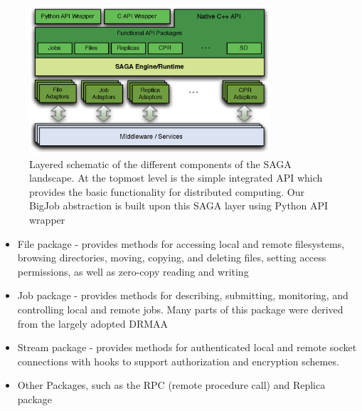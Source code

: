 \documentclass[preprint,12pt]{elsarticle}
\newcommand{\skonote}[1]{ {\textcolor{blue} { ***Jeff: #1 }}}
\newcommand{\skonote}[1]{}
\begin{document}
\begin{figure}
 \begin{center}
     \includegraphics[width=0.8\textwidth]{stci_saga_figures-1.eps}
 \end{center}
\caption{\small Layered schematic of the different components of the SAGA landscape. At the topmost level is the simple integrated API which provides the basic functionality for distributed computing. Our BigJob abstraction is built upon this SAGA layer using Python API wrapper}
 \label{Fig:SAGA1}
 \vspace{-1em}
\end{figure}

\begin{itemize}
\item File package - provides methods for accessing local and remote filesystems, browsing directories, moving, copying, and deleting files, setting access permissions, as well as zero-copy reading and writing
\item Job package - provides methods for describing, submitting, monitoring, and controlling local and remote jobs. Many parts of this package were derived from the largely adopted DRMAA %
\item Stream package - provides methods for authenticated local and remote socket connections with hooks to support authorization and encryption schemes.
\item Other Packages, such as the RPC (remote procedure call) and Replica package
\end{itemize}


\end{document}

